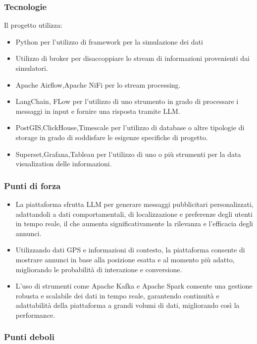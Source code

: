     \subsubsection{Tecnologie}
    Il progetto utilizza:
    \begin{itemize}
        \item Python per l'utilizzo di framework per la simulazione dei dati
        \item Utilizzo di broker per disaccoppiare lo stream di informazioni provenienti dai simulatori.
        \item Apache Airflow,Apache NiFi per lo stream processing.
        \item LangChain, FLow per l'utilizzo di uno strumento in grado di processare i messaggi in input e fornire una risposta tramite LLM.
        \item PostGIS,ClickHouse,Timescale per l'utilizzo di database o altre tipologie di storage in grado di soddisfare le esigenze specifiche di progetto. 
        \item Superset,Grafana,Tableau per l'utilizzo di uno o più strumenti per la data visualization delle informazioni.
    \end{itemize}

    \subsubsection{Punti di forza}

    \begin{itemize}
        \item La piattaforma sfrutta LLM per generare messaggi pubblicitari personalizzati, adattandoli a dati comportamentali, di localizzazione e preferenze degli utenti in tempo reale, il che aumenta significativamente la rilevanza e l’efficacia degli annunci.
        \item  Utilizzando dati GPS e informazioni di contesto, la piattaforma consente di mostrare annunci in base alla posizione esatta e al momento più adatto, migliorando le probabilità di interazione e conversione.
        \item L’uso di strumenti come Apache Kafka e Apache Spark consente una gestione robusta e scalabile dei dati in tempo reale, garantendo continuità e adattabilità della piattaforma a grandi volumi di dati, migliorando così la performance.
    \end{itemize}
    \subsubsection{Punti deboli}
    
